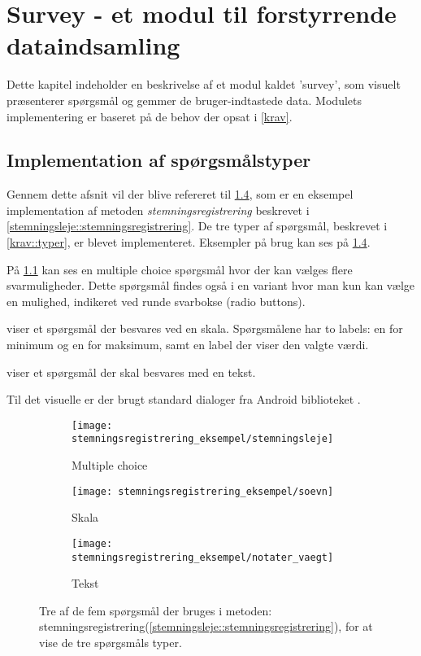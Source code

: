 \chapter{Survey - et modul til forstyrrende dataindsamling}\label{survey}
Dette kapitel indeholder en beskrivelse af et modul kaldet 'survey', som visuelt præsenterer spørgsmål og gemmer de bruger-indtastede data.
Modulets implementering er baseret på de behov der opsat i \cref{krav}.

\section{Implementation af spørgsmålstyper}\label{survey:spg}
Gennem dette afsnit vil der blive refereret til \cref{stemreg::spoergsmaal}, som er en eksempel implementation af metoden  \emph{stemningsregistrering} beskrevet i \cref{stemningsleje::stemningsregistrering}.
De tre typer af spørgsmål, beskrevet i \cref{krav::typer}, er blevet implementeret.
Eksempler på brug kan ses på \cref{stemreg::spoergsmaal}.

På \cref{stemreg::stemningsleje} kan ses en multiple choice spørgsmål hvor der kan vælges flere svarmuligheder.
Dette spørgsmål findes også i en variant hvor man kun kan vælge en mulighed, indikeret ved runde svarbokse (radio buttons).

 viser et spørgsmål der besvares ved en skala. 
Spørgsmålene har to labels: en for minimum og en for maksimum, samt en label der viser den valgte værdi.

 viser et spørgsmål der skal besvares med en tekst. 

Til det visuelle er der brugt standard dialoger fra Android biblioteket \cite{android_dialogs}.
	
\begin{figure}
	\centering
	\begin{subfigure}[b]{0.35\textwidth}
		\texttt{[image: stemningsregistrering\_eksempel/stemningsleje]}
		\caption{Multiple choice}\label{stemreg::stemningsleje}
	\end{subfigure}
	\hfill
\begin{minipage}[b]{0.35\textwidth}
	\centering
	\begin{subfigure}[b]{\textwidth}
		\texttt{[image: stemningsregistrering\_eksempel/soevn]}
		\caption{Skala}\label{stemreg::soevn}
	\end{subfigure}
	\newline 
	\begin{subfigure}[b]{\textwidth}
		\texttt{[image: stemningsregistrering\_eksempel/notater\_vaegt]}
		\caption{Tekst}\label{stemreg::notater_vaegt}
	\end{subfigure}	
\end{minipage}	
	\caption{Tre af de fem spørgsmål der bruges i metoden: stemningsregistrering(\cref{stemningsleje::stemningsregistrering}), for at vise de tre spørgsmåls typer.}\label{stemreg::spoergsmaal}
\end{figure}

